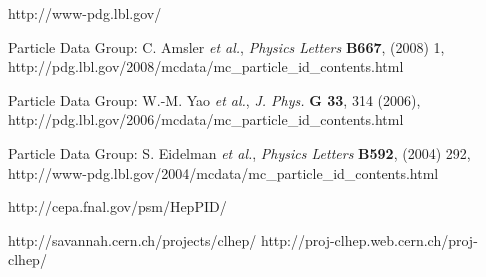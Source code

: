 
\def\etal{{\it et al.}}

\begin{thebibliography}{4}

http://www-pdg.lbl.gov/ 

Particle Data Group: C. Amsler \etal, \emph{Physics Letters} \textbf{B667}, (2008) 1, 
\newline
http://pdg.lbl.gov/2008/mcdata/mc\_particle\_id\_contents.html

Particle Data Group: W.-M. Yao \etal, \emph{J. Phys.} \textbf{G 33}, 314 (2006), 
\newline
http://pdg.lbl.gov/2006/mcdata/mc\_particle\_id\_contents.html

Particle Data Group: S. Eidelman  \etal, \emph{Physics Letters} \textbf{B592}, (2004) 292,
\newline
http://www-pdg.lbl.gov/2004/mcdata/mc\_particle\_id\_contents.html

http://cepa.fnal.gov/psm/HepPID/

http://savannah.cern.ch/projects/clhep/
\newline
http://proj-clhep.web.cern.ch/proj-clhep/

\end{thebibliography}
\newpage


